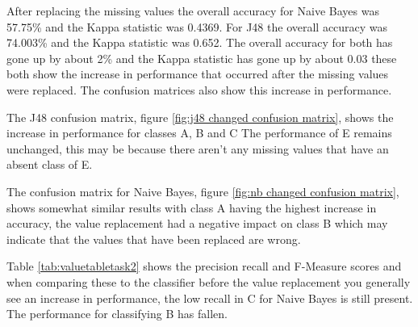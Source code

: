 \documentclass[10pt]{article}
\begin{document}
After replacing the missing values the overall accuracy for Naive Bayes was 57.75\% and the Kappa statistic was 0.4369. For J48 the overall accuracy was 74.003\% and the Kappa statistic was 0.652. The overall accuracy for both has gone up by about 2\% and the Kappa statistic has gone up by about 0.03 these both show the increase in performance that occurred after the missing values were replaced. The confusion matrices also show this increase in performance.

The J48 confusion matrix, figure \ref{fig:j48 changed confusion matrix}, shows the increase in performance for classes A, B and C The performance of E remains unchanged, this may be because there aren't any missing values that have an absent class of E.

The confusion matrix for Naive Bayes, figure \ref{fig:nb changed confusion matrix}, shows somewhat similar results with class A having the highest increase in accuracy, the value replacement had a negative impact on class B which may indicate that the values that have been replaced are wrong.

Table \ref{tab:valuetabletask2} shows the precision recall and F-Measure scores and when comparing these to the classifier before the value replacement you generally see an increase in performance, the low recall in C for Naive Bayes is still present. The performance for classifying B has fallen.
\end{document}
